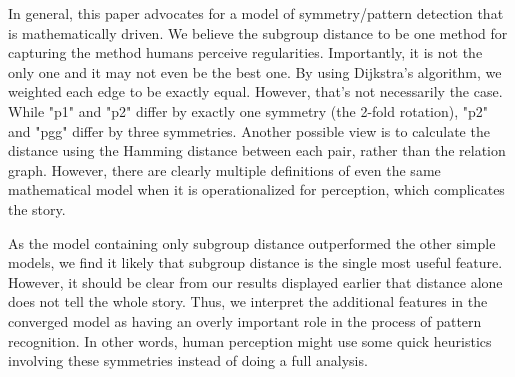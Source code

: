 In general, this paper advocates for a model of symmetry/pattern detection that is mathematically driven. We believe the subgroup distance to be one method for capturing the method humans perceive regularities. Importantly, it is not the only one and it may not even be the best one. By using Dijkstra's algorithm, we weighted each edge to be exactly equal. However, that's not necessarily the case. While "p1" and "p2" differ by exactly one symmetry (the 2-fold rotation), "p2" and "pgg" differ by three symmetries. Another possible view is to calculate the distance using the Hamming distance between each pair, rather than the relation graph. However, there are clearly multiple definitions of even the same mathematical model when it is operationalized for perception, which complicates the story.

As the model containing only subgroup distance outperformed the other simple models, we find it likely that subgroup distance is the single most useful feature. However, it should be clear from our results displayed earlier that distance alone does not tell the whole story. Thus, we interpret the additional features in the converged model as having an overly important role in the process of pattern recognition. In other words, human perception might use some quick heuristics involving these symmetries instead of doing a full analysis. 

\begin{table}
\centering
{}
\label{corr}
\caption{Correlation of Fixed Effects (note that this is the empirical correlation rather than the analytical relationship)}
\end{table}

